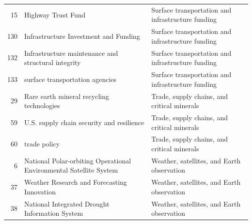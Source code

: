 \begin{longtable}{rll}
15 & Highway Trust Fund & Surface transportation and infrastructure funding \\
130 & Infrastructure Investment and Funding & Surface transportation and infrastructure funding \\
132 & Infrastructure maintenance and structural integrity & Surface transportation and infrastructure funding \\
133 & surface transportation agencies & Surface transportation and infrastructure funding \\
29 & Rare earth mineral recycling technologies & Trade, supply chains, and critical minerals \\
59 & U.S. supply chain security and resilience & Trade, supply chains, and critical minerals \\
60 & trade policy & Trade, supply chains, and critical minerals \\
6 & National Polar-orbiting Operational Environmental Satellite System & Weather, satellites, and Earth observation \\
37 & Weather Research and Forecasting Innovation & Weather, satellites, and Earth observation \\
38 & National Integrated Drought Information System & Weather, satellites, and Earth observation \\
\end{longtable}

